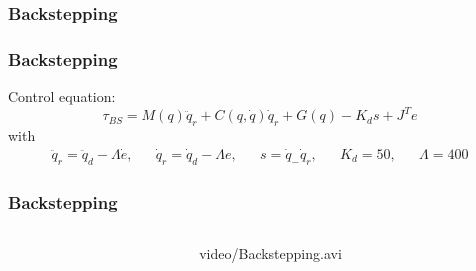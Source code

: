 \subsubsection{Backstepping}
\begin{frame}
\frametitle{Backstepping}
Control equation:
\begin{equation}
	\tau_{BS} = M(q)\ddot{q}_r + C(q,\dot{q})\dot{q}_r + G(q) - K_ds + J^Te
\end{equation}
with
\begin{align*}
\ddot{q}_r=\ddot{q}_d - \Lambda\dot{e}, && \dot{q}_r=\dot{q}_d - \Lambda e, && s=\dot{q}_ - \dot{q}_r, && K_d=50, && \Lambda=400
\end{align*}
\end{frame}
%
\begin{frame}
\frametitle{Backstepping}
%
\begin{columns}
\begin{column}{0.4\textwidth}
\end{column}
\begin{column}{0.6\textwidth}
	\begin{center}
		{video/Backstepping.avi}
	\end{center}
\end{column}
\end{columns}
\end{frame}
%
